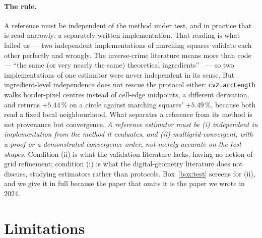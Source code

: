 \documentclass{article}
\newcommand{\pct}[1]{$#1\,\%$}
\begin{document}
\paragraph{The rule.} A reference must be independent of the method under test, and in practice
that is read narrowly: a separately written implementation. That reading is what failed us --- two
independent implementations of marching squares validate each other perfectly and wrongly.
The inverse-crime literature means more than code --- ``the same (or very nearly the same)
theoretical ingredients''~\citep{wirgin2004} --- so two implementations of one estimator were never
independent in its sense. But ingredient-level independence does not rescue the protocol either:
\texttt{cv2.arcLength} walks border-pixel centres instead of cell-edge midpoints, a different
derivation, and returns \pct{+5.44} on a circle against marching squares' \pct{+5.49}, because both
read a fixed local neighbourhood. What separates a reference from its method is not provenance but
convergence. \emph{A reference estimator must be (i) independent in implementation from the method
it evaluates, and (ii) multigrid-convergent, with a proof or a demonstrated convergence order, not
merely accurate on the test shapes.} Condition (ii) is what the validation literature lacks, having
no notion of grid refinement; condition (i) is what the digital-geometry literature does not
discuss, studying estimators rather than protocols. Box~\ref{box:test} screens for (ii), and we
give it in full because the paper that omits it is the paper we wrote in 2024.


\section{Limitations}
\end{document}
